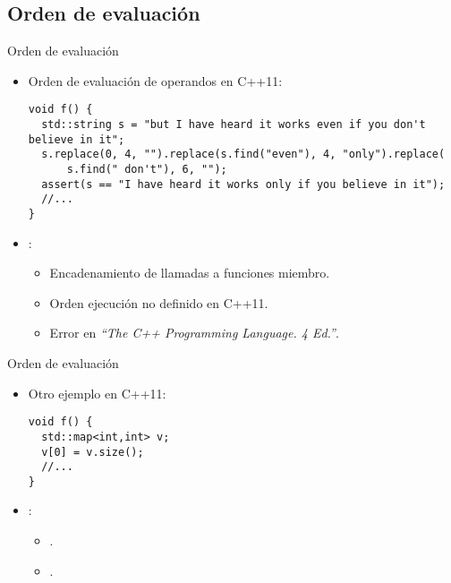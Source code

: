 \subsection{Orden de evaluación}

\begin{frame}[t,fragile]{Orden de evaluación}
\begin{itemize}
  \item Orden de evaluación de operandos en C++11:
\begin{lstlisting}[basicstyle=\scriptsize]
void f() {
  std::string s = "but I have heard it works even if you don't believe in it";
  s.replace(0, 4, "").replace(s.find("even"), 4, "only").replace(
      s.find(" don't"), 6, "");
  assert(s == "I have heard it works only if you believe in it");
  //...
}
\end{lstlisting}

  \vfill\pause
  \item {}:
    \begin{itemize}
      \item Encadenamiento de llamadas a funciones miembro.
      \item Orden ejecución no definido en C++11.
      \item Error en \emph{``The C++ Programming Language. 4 Ed.''}.
    \end{itemize}
\end{itemize}
\end{frame}

\begin{frame}[t,fragile]{Orden de evaluación}
\begin{itemize}
  \item Otro ejemplo en C++11:
\begin{lstlisting}
void f() {
  std::map<int,int> v;
  v[0] = v.size();
  //...
}
\end{lstlisting}
  \item {}:
    \begin{itemize}
      \item {}.
      \item {}.
    \end{itemize}
\end{itemize}
\end{frame}

